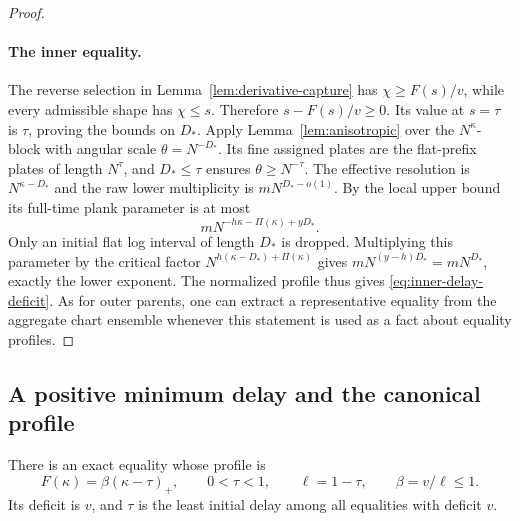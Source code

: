 \begin{proof}
\paragraph{The inner equality.}
The reverse selection in Lemma~\ref{lem:derivative-capture} has
$\chi\ge F(s)/v$, while every admissible shape has $\chi\le s$.
Therefore $s-F(s)/v\ge0$. Its value at $s=\tau$ is $\tau$, proving the
bounds on $D_*$. Apply Lemma~\ref{lem:anisotropic} over the
$N^\kappa$-block with angular scale $\theta=N^{-D_*}$. Its fine assigned
plates are the flat-prefix plates of length $N^\tau$, and
$D_*\le\tau$ ensures $\theta\ge N^{-\tau}$. The effective resolution
is $N^{\kappa-D_*}$ and the raw lower multiplicity is
$mN^{D_*-o(1)}$. By the local upper bound its full-time plank parameter
is at most
\[
 mN^{-h\kappa-\Pi(\kappa)+yD_*}.
\]
Only an initial flat log interval of length $D_*$ is dropped. Multiplying
this parameter by the critical factor
$N^{h(\kappa-D_*)+\Pi(\kappa)}$ gives
$mN^{(y-h)D_*}=mN^{D_*}$, exactly the lower exponent. The normalized
profile thus gives \eqref{eq:inner-delay-deficit}. As for outer parents,
one can extract a representative equality from the aggregate chart
ensemble whenever this statement is used as a fact about equality
profiles.
\end{proof}

\subsection{A positive minimum delay and the canonical profile}

\begin{proposition}
\label{prop:canonical}
There is an exact equality whose profile is
\begin{equation}
 F(\kappa)=\beta(\kappa-\tau)_+,
 \qquad 0<\tau<1,\qquad
 \ell=1-\tau,\qquad \beta=v/\ell\le1.
 \label{eq:canonical-profile}
\end{equation}
Its deficit is $v$, and $\tau$ is the least initial delay among all
equalities with deficit $v$.
\end{proposition}

